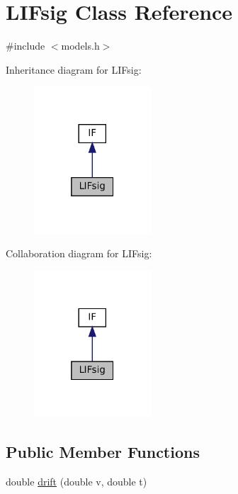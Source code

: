 \hypertarget{classLIFsig}{}\section{L\+I\+Fsig Class Reference}
\label{classLIFsig}


{\ttfamily \#include $<$models.\+h$>$}



Inheritance diagram for L\+I\+Fsig\+:
\nopagebreak
\begin{figure}[H]
\begin{center}
\leavevmode
\includegraphics[width=124pt]{classLIFsig__inherit__graph}
\end{center}
\end{figure}


Collaboration diagram for L\+I\+Fsig\+:
\nopagebreak
\begin{figure}[H]
\begin{center}
\leavevmode
\includegraphics[width=124pt]{classLIFsig__coll__graph}
\end{center}
\end{figure}
\subsection*{Public Member Functions}
\begin{DoxyCompactItemize}
\item 
double \mbox{\hyperlink{classLIFsig_a169dcb5d3704157102bbc725445cf0a5}{drift}} (double v, double t)
\end{DoxyCompactItemize}
